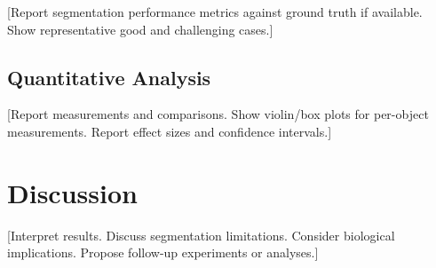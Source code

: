 \documentclass[11pt,a4paper]{article}
\begin{document}
[Report segmentation performance metrics against ground truth if available.
Show representative good and challenging cases.]

\subsection{Quantitative Analysis}

[Report measurements and comparisons. Show violin/box plots for per-object
measurements. Report effect sizes and confidence intervals.]


\section{Discussion}

[Interpret results. Discuss segmentation limitations. Consider biological
implications. Propose follow-up experiments or analyses.]



\end{document}
